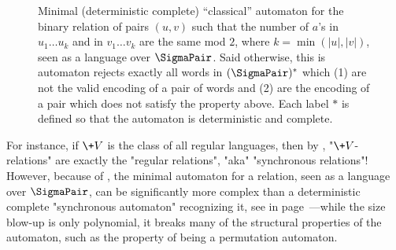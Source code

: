 \begin{figure}[tbp]
	\begin{center}
	\end{center}
	\caption{
		\AP\label{fig:min-auto}
		Minimal (deterministic complete) ``classical'' automaton for 
		the binary relation
		of pairs $(u,v)$ such that the number of $a$'s in $u_1\hdots u_k$
		and in $v_1\hdots v_k$ are the same mod $2$, where $k = \min(|u|, |v|)$,
		seen as a language over $\SigmaPair$.
		Said otherwise, this is automaton rejects exactly all words in $(\SigmaPair)^*$ which (1)
		are not the valid encoding of a pair of words and (2) are the encoding of a pair
		which does not satisfy the property above.
		Each label $*$ is defined so that the automaton is deterministic and complete.
	} 
\end{figure}
For instance, if $\+V$ is the class of all regular languages, then by
, "$\+V$-relations" are exactly the "regular relations", "aka" "synchronous relations"!
However, because of
, the minimal automaton for a relation, seen as a language over $\SigmaPair$,
can be significantly more complex than a deterministic complete "synchronous automaton" recognizing it, see  in page~\pageref{fig:min-auto}---while the size blow-up is only polynomial, it breaks many of the structural properties of the automaton, such as the property of being a permutation automaton.

